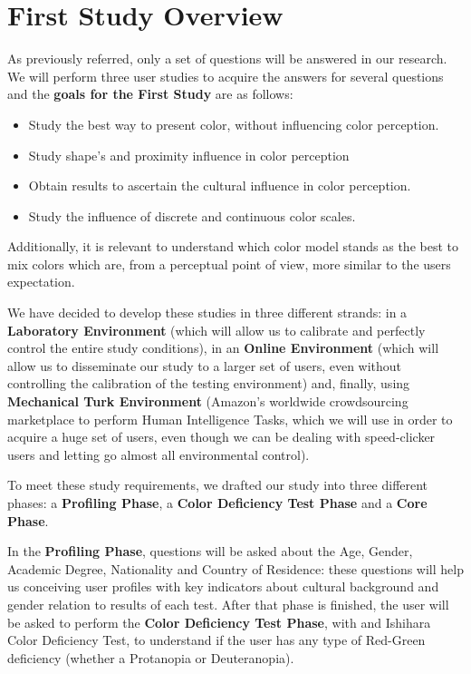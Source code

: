 \documentclass{report}
\begin{document}
\section{First Study Overview}
%
As previously referred, only a set of questions will be answered in our research. We will perform three user studies to acquire the answers for several questions and the \textbf{goals for the First Study} are as follows:
\begin{itemize}
	\item Study the best way to present color, without influencing color perception.
    \item Study shape's and proximity influence in color perception
    \item Obtain results to ascertain the cultural influence in color perception.
    \item Study the influence of discrete and continuous color scales.
\end{itemize}
%
Additionally, it is relevant to understand which color model stands as the best to mix colors which are, from a perceptual point of view, more similar to the users expectation. \par
We have decided to develop these studies in three different strands: in a \textbf{Laboratory Environment} (which will allow us to calibrate and perfectly control the entire study conditions), in an \textbf{Online Environment} (which will allow us to disseminate our study to a larger set of users, even without controlling the calibration of the testing environment) and, finally, using \textbf{Mechanical Turk Environment} (Amazon's worldwide crowdsourcing marketplace to perform Human Intelligence Tasks, which we will use in order to acquire a huge set of users, even though we can be dealing with speed-clicker users and letting go almost all environmental control). \par
To meet these study requirements, we drafted our study into three different phases: a \textbf{Profiling Phase}, a \textbf{Color Deficiency Test Phase} and a \textbf{Core Phase}. \par
In the \textbf{Profiling Phase}, questions will be asked about the Age, Gender, Academic Degree, Nationality and Country of Residence: these questions will help us
conceiving user profiles with key indicators about cultural background and gender relation to results of each test. After that phase is finished, the user will be asked to perform the \textbf{Color Deficiency Test Phase}, with and Ishihara Color Deficiency Test, to understand if the user has any type of Red-Green deficiency
(whether a Protanopia or Deuteranopia). \par
%
\end{document}
